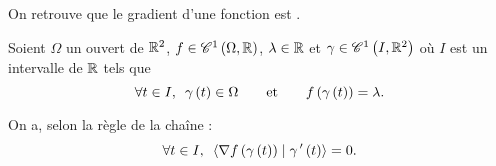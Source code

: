 \begin{rem}
On retrouve que le gradient d'une fonction est .

Soient \(\Omega\) un ouvert de \(\mathbb{R}^2\), \(f\in\mathscr{C}^{1}\left(\Omega,\mathbb{R}\right)\), \(\lambda\in\mathbb{R}\) et \(\gamma\in\mathscr{C}^{1}\left(I,\mathbb{R}^2\right)\) où \(I\) est un intervalle de \(\mathbb{R}\) tels que \[\quantifs{\forall t\in I}\gamma\paren{t}\in\Omega\qquad\text{et}\qquad f\paren{\gamma\paren{t}}=\lambda.\]

On a, selon la règle de la chaîne : \[\quantifs{\forall t\in I}\ps{\nabla f\paren{\gamma\paren{t}}}{\gamma\prim\paren{t}}=0.\]
\end{rem}

